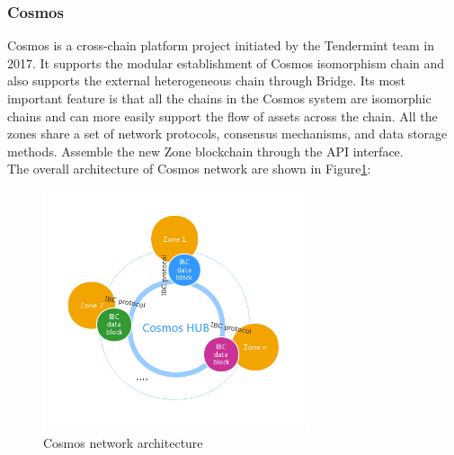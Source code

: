 \subsubsection{Cosmos}
\noindent Cosmos\cite{cosmos} is a cross-chain platform project initiated by the Tendermint team in 2017. It supports the modular establishment of Cosmos isomorphism chain and also supports the external heterogeneous chain through Bridge. Its most important feature is that all the chains in the Cosmos system are isomorphic chains and can more easily support the flow of assets across the chain. All the zones share a set of network protocols, consensus mechanisms, and data storage methods. Assemble the new Zone blockchain through the API interface.\\
\noindent The overall architecture of Cosmos network are shown in Figure\ref{fig:cosmos}:
        \begin{figure}[H]
        \includegraphics[width=0.7\textwidth]{./figures/cosmos.png}
        \centering
        \caption{Cosmos network architecture}%
        \centering
        \label{fig:cosmos}
        \end{figure}
        
